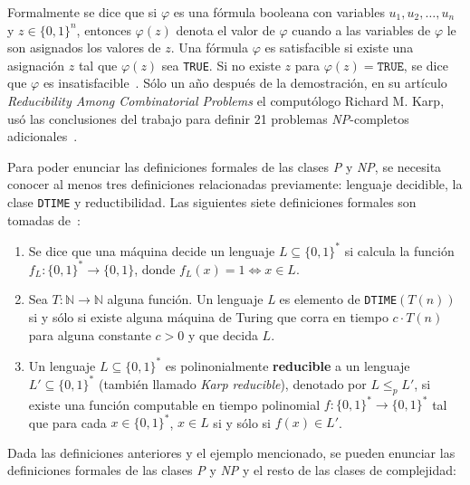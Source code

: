 Formalmente se dice que si $\varphi$ es una fórmula booleana con
variables $u_{1}, u_{2}, \ldots, u_{n}$ y $z \in \{0,1\}^{n}$, entonces
$\varphi(z)$ denota el valor de $\varphi$ cuando a las variables de $\varphi$
le son asignados los valores de $z$. Una fórmula $\varphi$ es satisfacible si
existe una asignación $z$ tal que $\varphi(z)$ sea \texttt{TRUE}. Si no existe
$z$ para $\varphi(z) = \texttt{TRUE}$, se dice que $\varphi$ es
insatisfacible~\cite{arora2009computational}. Sólo un año después de la
demostración, en su artículo \textit{Reducibility Among Combinatorial Problems} el computólogo
Richard M. Karp, usó las conclusiones del trabajo para definir 21 problemas
\textsl{NP}-completos adicionales~\cite{Karp1972}.

Para poder enunciar las definiciones formales de las clases \textsl{P} y \textsl{NP},
se necesita conocer al menos tres definiciones relacionadas previamente:
lenguaje decidible, la clase \texttt{DTIME} y reductibilidad. Las siguientes
siete definiciones formales son tomadas de~\cite{arora2009computational}:

\begin{enumerate}
 \item
  Se dice que una máquina decide un lenguaje $L \subseteq \{0, 1\}^{*}$ si
 calcula la función $f_{L}:\{0,1\}^{*} \longrightarrow \{0,1\}$, donde
 $f_{L} (x) = 1 \Leftrightarrow x \in L$.

 \item
  Sea $T: \mathbb{N} \longrightarrow \mathbb{N}$
 alguna función. Un lenguaje \textsl{L} es elemento de \texttt{DTIME}$(T(n))$ si y sólo
 si existe alguna máquina de Turing que corra en tiempo $c \cdot T(n)$ para alguna
 constante $c > 0$ y que decida $L$.

 \item
Un lenguaje $L \subseteq \{0,1\}^{*}$ es polinonialmente \textbf{reducible} a
un lenguaje $L' \subseteq \{0,1\}^{*}$ (también llamado
\textit{Karp reducible}), denotado por $L \leq_{p} L'$, si existe una
función computable en tiempo polinomial
$f : \{0,1\}^{*} \longrightarrow \{0,1\}^{*}$ tal que para cada
$x \in \{0,1\}^{*}$, $x \in L$ si y sólo si $f(x) \in L'$.
\end{enumerate}

\noindent
Dada las definiciones anteriores y el ejemplo mencionado, se pueden enunciar las
definiciones formales de las clases \textsl{P} y \textsl{NP} y el resto de las
clases de complejidad:

